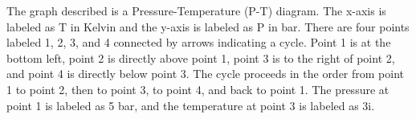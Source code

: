 The graph described is a Pressure-Temperature (P-T) diagram. The x-axis is labeled as T in Kelvin and the y-axis is labeled as P in bar. There are four points labeled 1, 2, 3, and 4 connected by arrows indicating a cycle. Point 1 is at the bottom left, point 2 is directly above point 1, point 3 is to the right of point 2, and point 4 is directly below point 3. The cycle proceeds in the order from point 1 to point 2, then to point 3, to point 4, and back to point 1. The pressure at point 1 is labeled as 5 bar, and the temperature at point 3 is labeled as 3i.